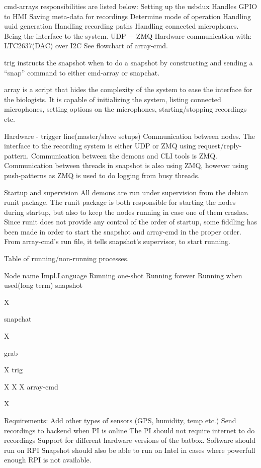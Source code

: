 cmd-arrays responsibilities are listed below:
Setting up the usbdux 
Handles GPIO to HMI
Saving meta-data for recordings
Determine mode of operation
Handling uuid generation
Handling recording paths
Handling connected microphones.
Being the interface to the system.
UDP + ZMQ
Hardware communication with:
LTC2637(DAC) over I2C
See flowchart of array-cmd.

trig instructs the snapshot when to do a snapshot by constructing and sending a “snap” command to either cmd-array or snapchat.

array is a script that hides the complexity of the system to ease the interface for the biologists. It is capable of initializing the system, listing connected microphones, setting options on the microphones, starting/stopping recordings etc.

Hardware - trigger line(master/slave setups)
Communication between nodes.
The interface to the recording system is either UDP or ZMQ using request/reply-pattern. Communication between the demons and CLI tools is ZMQ. Communication between threads in snapshot is also using ZMQ, however using push-patterns as ZMQ is used to do logging from busy threads.

Startup and supervision
All demons are run under supervision from the debian runit package. The runit package is both responsible for starting the nodes during startup, but also to keep the nodes running in case one of them crashes. Since runit does not provide any control of the order of startup, some fiddling has been made in order to start the snapshot and array-cmd in the proper order. From array-cmd’s run file, it tells snapshot’s supervisor, to start running.

Table of running/non-running processes.


Node name
Impl.Language
Running one-shot
Running forever
Running when used(long term)
snapshot




X


snapchat


X




grab






X
trig


X
X
X
array-cmd




X




Requirements:
Add other types of sensors (GPS, humidity, temp etc.)
Send recordings to backend when PI is online
The PI should not require internet to do recordings
Support for different hardware versions of the batbox.
Software should run on RPI
Snapshot should also be able to run on Intel in cases where powerfull enough RPI is not available.




